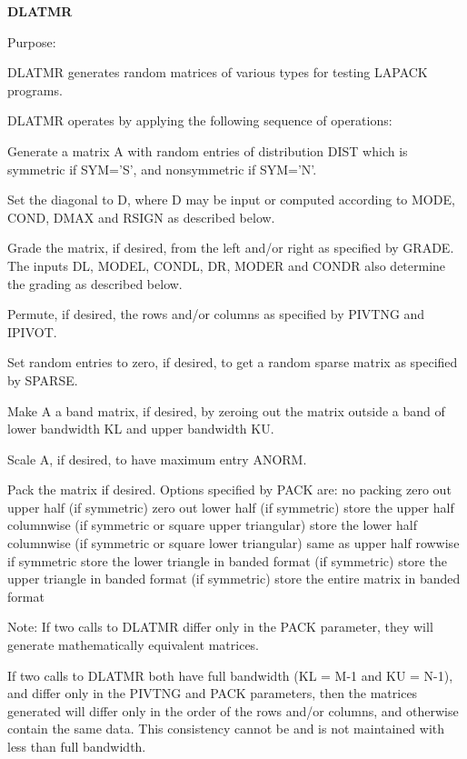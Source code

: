 {\bfseries D\+L\+A\+T\+M\+R} 

\begin{DoxyParagraph}{Purpose\+: }
\begin{DoxyVerb}    DLATMR generates random matrices of various types for testing
    LAPACK programs.

    DLATMR operates by applying the following sequence of
    operations:

      Generate a matrix A with random entries of distribution DIST
         which is symmetric if SYM='S', and nonsymmetric
         if SYM='N'.

      Set the diagonal to D, where D may be input or
         computed according to MODE, COND, DMAX and RSIGN
         as described below.

      Grade the matrix, if desired, from the left and/or right
         as specified by GRADE. The inputs DL, MODEL, CONDL, DR,
         MODER and CONDR also determine the grading as described
         below.

      Permute, if desired, the rows and/or columns as specified by
         PIVTNG and IPIVOT.

      Set random entries to zero, if desired, to get a random sparse
         matrix as specified by SPARSE.

      Make A a band matrix, if desired, by zeroing out the matrix
         outside a band of lower bandwidth KL and upper bandwidth KU.

      Scale A, if desired, to have maximum entry ANORM.

      Pack the matrix if desired. Options specified by PACK are:
         no packing
         zero out upper half (if symmetric)
         zero out lower half (if symmetric)
         store the upper half columnwise (if symmetric or
             square upper triangular)
         store the lower half columnwise (if symmetric or
             square lower triangular)
             same as upper half rowwise if symmetric
         store the lower triangle in banded format (if symmetric)
         store the upper triangle in banded format (if symmetric)
         store the entire matrix in banded format

    Note: If two calls to DLATMR differ only in the PACK parameter,
          they will generate mathematically equivalent matrices.

          If two calls to DLATMR both have full bandwidth (KL = M-1
          and KU = N-1), and differ only in the PIVTNG and PACK
          parameters, then the matrices generated will differ only
          in the order of the rows and/or columns, and otherwise
          contain the same data. This consistency cannot be and
          is not maintained with less than full bandwidth.\end{DoxyVerb}
 
\end{DoxyParagraph}

